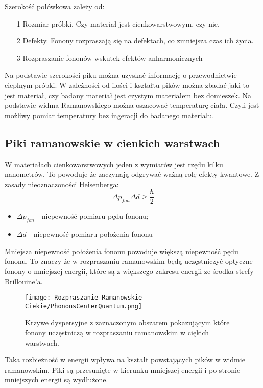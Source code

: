 Szerokość połówkowa zależy od:
\begin{itemize}
	\item[1]{Rozmiar próbki. Czy materiał jest cienkowarstwowym, czy nie.}
	\item[2]{Defekty. Fonony rozpraszają się na defektach, co zmniejsza czas ich życia.}
	\item[3]{Rozpraszanie fononów wskutek efektów anharmonicznych}
\end{itemize}
Na podstawie szerokości piku można uzyskać informację o przewodnictwie cieplnym próbki. 
W zależności od ilości i kształtu pików można zbadać jaki to jest materiał, czy badany materiał jest czystym materiałem bez domieszek.
Na podstawie widma Ramanowskiego można oszacować temperaturę ciała. Czyli jest możliwy pomiar temperatury bez ingeracji do badanego materiału.

\subsection{Piki ramanowskie w cienkich warstwach}
W materiałach cienkowarstwowych jeden z wymiarów jest rzędu kilku nanometrów. To powoduje że zaczynają odgrywać ważną rolę efekty kwantowe. Z zasady nieoznaczoności Heisenberga:
\begin{equation}
	\Delta p_{fon} \Delta d \geq \frac{\hbar}{2}
\end{equation}
\begin{itemize}
	\item{$\Delta p_{fon}$ - niepewność pomiaru pędu fononu};
	\item{$\Delta d$ - niepewność pomiaru położenia fononu}
\end{itemize}
Mniejsza niepewność położenia fononu powoduje większą niepewność pędu fononu. To znaczy że w rozpraszaniu ramanowskim będą uczęstniczyć optyczne fonony o mniejszej energii, które są z większego zakresu energii ze środka strefy Brillouine'a.

\begin{figure}[H]
	\begin{center}
		\texttt{[image: Rozpraszanie-Ramanowskie-Ciekie/PhononsCenterQuantum.png]}
		\caption{Krzywe dyspersyjne z zaznaczonym obszarem pokazującym które fonony uczęstniczą w rozpraszaniu ramanowskim w ciękich warstwach.}
	\end{center}
\end{figure}

Taka rozbieżność w energii wpływa na kształt powstających pików w widmie ramanowskim.
Piki są przesunięte w kierunku mniejszej energii i po stronie mniejszych energii są wydłużone.

